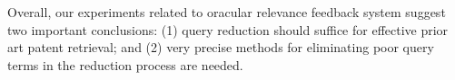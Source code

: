 %
%


Overall, our experiments related to oracular relevance feedback system
suggest two important conclusions: (1) query reduction should suffice for effective prior art patent retrieval; and (2) very precise methods for eliminating poor query terms in the reduction process are needed.


